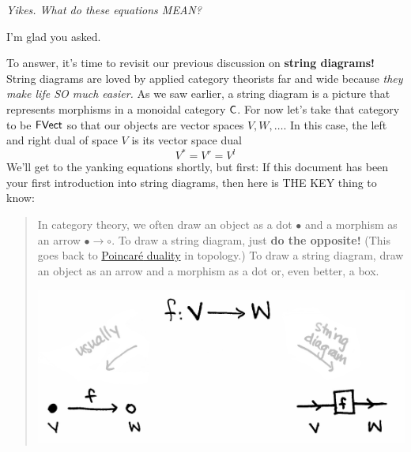 \documentclass{tufte-handout-tai}
\newcommand{\cat}[1]{{\normalfont\textsf{#1}}}
\theoremstyle{plain}
\theoremstyle{definition}
\theoremstyle{remark}
\begin{document}
\vspace{0.5cm}
\noindent \textit{Yikes. What do these equations MEAN?}
\vspace{0.5cm}
 
\noindent I'm glad you asked. 
\vspace{0.5cm}

To answer, it's time to revisit our previous discussion on \textbf{string diagrams!} String diagrams are loved by applied category theorists far and wide because \textit{they make life SO much easier.}
As we saw earlier, a string diagram is  a picture that represents morphisms in a monoidal category $\cat{C}$. For now let's take that category to be $\cat{FVect}$ so that our objects are vector spaces $V,W,\ldots$. In this case, the left and right dual of space $V$ is its vector space dual
\[V^*= V^r=V^l\]
We'll get to the yanking equations shortly, but first: If this document has been your first introduction into string diagrams, then here is THE KEY thing to know:
	\begin{quote}
	In category theory, we often draw an object as a dot $\bullet$ and a morphism as an arrow $\bullet\to\circ$. To draw a string diagram, just \textbf{do the opposite!} (This goes back to \href{https://en.wikipedia.org/wiki/Poincar%C3%A9_duality}{Poincar{\'e} duality} in topology.) To draw a string diagram, draw an object as an arrow and a morphism as a dot or, even better, a box. 
	\begin{center}
	\includegraphics[width=!,totalheight=!,scale=0.6]{maps.jpg}
	\end{center}
	\end{quote}
\end{document}
